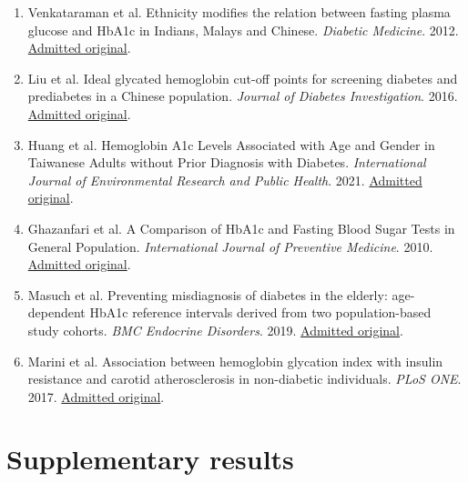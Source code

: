 \documentclass[10pt,twocolumn]{article}
\begin{document}
\begin{enumerate}
\item Venkataraman et al. Ethnicity modifies the relation between fasting plasma glucose and HbA1c in Indians, Malays and Chinese. \emph{Diabetic Medicine}. 2012. \href{https://pmc.ncbi.nlm.nih.gov/articles/PMC3504343/}{Admitted original}.

\item Liu et al. Ideal glycated hemoglobin cut-off points for screening diabetes and prediabetes in a Chinese population. \emph{Journal of Diabetes Investigation}. 2016. \href{https://pmc.ncbi.nlm.nih.gov/articles/PMC5009131/}{Admitted original}.

\item Huang et al. Hemoglobin A1c Levels Associated with Age and Gender in Taiwanese Adults without Prior Diagnosis with Diabetes. \emph{International Journal of Environmental Research and Public Health}. 2021. \href{https://pmc.ncbi.nlm.nih.gov/articles/PMC8038122/}{Admitted original}.

\item Ghazanfari et al. A Comparison of HbA1c and Fasting Blood Sugar Tests in General Population. \emph{International Journal of Preventive Medicine}. 2010. \href{https://pmc.ncbi.nlm.nih.gov/articles/PMC3075530/}{Admitted original}.

\item Masuch et al. Preventing misdiagnosis of diabetes in the elderly: age-dependent HbA1c reference intervals derived from two population-based study cohorts. \emph{BMC Endocrine Disorders}. 2019. \href{https://pmc.ncbi.nlm.nih.gov/articles/PMC6371438/}{Admitted original}.

\item Marini et al. Association between hemoglobin glycation index with insulin resistance and carotid atherosclerosis in non-diabetic individuals. \emph{PLoS ONE}. 2017. \href{https://pmc.ncbi.nlm.nih.gov/articles/PMC5398507/}{Admitted original}.

\end{enumerate}

\endgroup

\clearpage

\onecolumn

\section*{Supplementary results}

\setcounter{figure}{0}

\renewcommand{\thefigure}{S\arabic{figure}}
\end{document}
